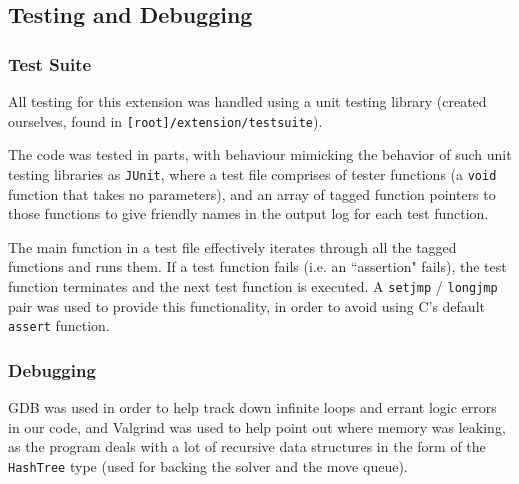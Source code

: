 \documentclass[8pt]{article}
\begin{document}
\subsection{Testing and Debugging}

\subsubsection{Test Suite}

All testing for this extension was handled using a unit testing library (created ourselves, found in \texttt{[root]/extension/testsuite}).

The code was tested in parts, with behaviour mimicking the behavior of such unit testing libraries as \texttt{JUnit}, where a test file comprises of tester functions (a \texttt{void} function that takes no parameters), and an array of tagged function pointers to those functions to give friendly names in the output log for each test function.

The main function in a test file effectively iterates through all the tagged functions and runs them.
If a test function fails (i.e. an ``assertion" fails), the test function terminates and the next test function is executed.
A \texttt{setjmp} / \texttt{longjmp} pair was used to provide this functionality, in order to avoid using C's default \texttt{assert} function.

\subsubsection{Debugging}

GDB was used in order to help track down infinite loops and errant logic errors in our code, and Valgrind was used to help point out where memory was leaking, as the program deals with a lot of recursive data structures in the form of the \texttt{HashTree} type (used for backing the solver and the move queue).
\end{document}
